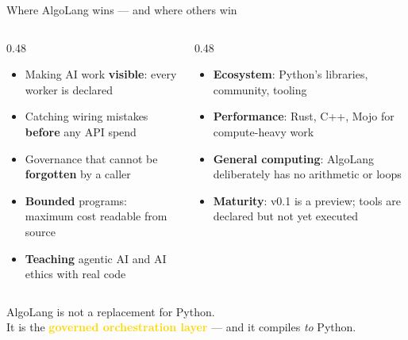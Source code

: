 \documentclass[aspectratio=169,11pt]{beamer}
\begin{document}
\begin{frame}{Where AlgoLang wins --- and where others win}
\vspace{1mm}
\begin{columns}[T]
\begin{column}{0.48\textwidth}
\begin{tcolorbox}[enhanced,colback=leaf!7,colframe=leaf,arc=3pt,title={\bfseries AlgoLang is stronger at},colbacktitle=leaf,fontupper=\scriptsize\raggedright]
\begin{itemize}
  \item Making AI work \textbf{visible}: every worker is declared
  \item Catching wiring mistakes \textbf{before} any API spend
  \item Governance that cannot be \textbf{forgotten} by a caller
  \item \textbf{Bounded} programs: maximum cost readable from source
  \item \textbf{Teaching} agentic AI and AI ethics with real code
\end{itemize}
\end{tcolorbox}
\end{column}
\begin{column}{0.48\textwidth}
\begin{tcolorbox}[enhanced,colback=amber!8,colframe=amber,arc=3pt,title={\bfseries Others are stronger at},colbacktitle=amber,fontupper=\scriptsize\raggedright]
\begin{itemize}
  \item \textbf{Ecosystem}: Python's libraries, community, tooling
  \item \textbf{Performance}: Rust, C++, Mojo for compute-heavy work
  \item \textbf{General computing}: AlgoLang deliberately has no arithmetic or loops
  \item \textbf{Maturity}: v0.1 is a preview; tools are declared but not yet executed
\end{itemize}
\end{tcolorbox}
\end{column}
\end{columns}
\vspace{1mm}
\begin{tcolorbox}[enhanced,colback=navy,colframe=navy,coltext=white,arc=3pt,fontupper=\small,halign=center]
 AlgoLang is not a replacement for Python.\\ It is the \textcolor{gold}{\textbf{governed orchestration layer}} --- and it compiles \emph{to} Python.
\end{tcolorbox}
\end{frame}
\end{document}
